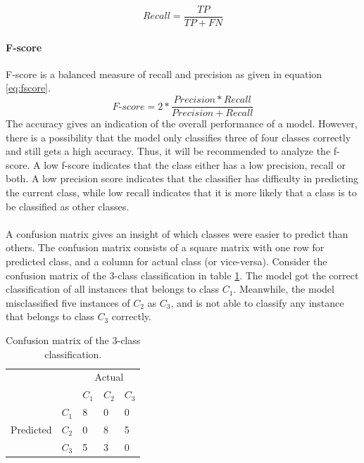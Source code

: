 \documentclass[USenglish]{ifimaster}  %
\begin{document}
	\begin{equation}
	Recall = \frac{TP}{TP + FN}
	\label{eq:recall}
	\end{equation}
	
	\paragraph{F-score}
	F-score is a balanced measure of recall and precision as given in equation \ref{eq:fscore}.
	\begin{equation}
	\textit{F-score} = 2*\frac{Precision*Recall}{Precision + Recall}
	\label{eq:fscore}
	\end{equation}
	\FloatBarrier
The accuracy gives an indication of the overall performance of a model. However, there is a possibility that the model only classifies three of four classes correctly and still gets a high accuracy. Thus, it will be recommended to analyze the f-score. A low f-score indicates that the class either has a low precision, recall or both. A low precision score indicates that the classifier has difficulty in predicting the current class, while low recall indicates that it is more likely that a class is to be classified as other classes.
\\
\\
A confusion matrix gives an insight of which classes were easier to predict than others. The confusion matrix consists of a square matrix with one row for predicted class, and a column for actual class (or vice-versa). Consider the confusion matrix of the 3-class classification in table \ref{tab:cmatrix}. The model got the correct classification of all instances that belongs to class $C_1$. Meanwhile, the model misclassified five instances of $C_2$ as $C_3$, and is not able to classify any instance that belongs to class $C_3$ correctly. 
	
	\begin{table}[h]
		\centering
		\begin{tabular}{ll|l|l|l|}
			\cline{3-5}
			&  & \multicolumn{3}{c|}{Actual} \\ \cline{3-5} 
			&  & $C_1$ & $C_2$ & $C_3$ \\ \hline
			\multicolumn{1}{|l|}{\multirow{3}{*}{Predicted}} & $C_1$ & 8 & 0 & 0 \\ \cline{2-5} 
			\multicolumn{1}{|l|}{} & $C_2$ & 0 & 8 & 5 \\ \cline{2-5} 
			\multicolumn{1}{|l|}{} & $C_3$ & 5 & 3 & 0 \\ \hline
		\end{tabular}
		\caption[Confusion matrix of the 3-class classification]{Confusion matrix of the 3-class classification.}
		\label{tab:cmatrix}
	\end{table}
	
\end{document}
